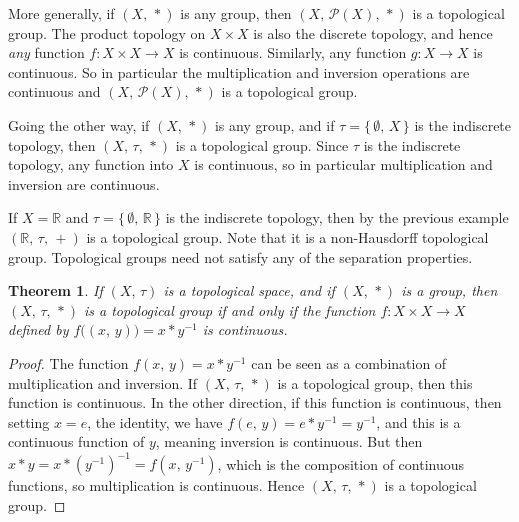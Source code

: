 \documentclass{article}
\theoremstyle{plain}
\newtheorem{theorem}{Theorem}[section]
\theoremstyle{normal}
\newenvironment{example}{%
    \pushQED{\qed}\renewcommand{\qedsymbol}{$\blacksquare$}\examplex%
}{%
    \popQED\endexamplex%
}
\begin{document}
        \begin{example}
            More generally, if $(X,\,*)$ is any group, then
            $(X,\,\mathcal{P}(X),\,*)$ is a topological group. The product
            topology on $X\times{X}$ is also the discrete topology, and hence
            \textit{any} function $f:X\times{X}\rightarrow{X}$ is continuous.
            Similarly, any function $g:X\rightarrow{X}$ is continuous. So
            in particular the multiplication and inversion operations are
            continuous and $(X,\,\mathcal{P}(X),\,*)$ is a topological group.
        \end{example}
        \begin{example}
            Going the other way, if $(X,\,*)$ is any group, and if
            $\tau=\{\,\emptyset,\,X\,\}$ is the indiscrete topology, then
            $(X,\,\tau,\,*)$ is a topological group. Since $\tau$ is the
            indiscrete topology, any function into $X$ is continuous,
            so in particular multiplication and inversion are continuous.
        \end{example}
        \begin{example}
            If $X=\mathbb{R}$ and $\tau=\{\,\emptyset,\,\mathbb{R}\,\}$ is the
            indiscrete topology, then by the previous example
            $(\mathbb{R},\,\tau,\,+)$ is a topological group. Note that it is
            a non-Hausdorff topological group. Topological groups need not
            satisfy any of the separation properties.
        \end{example}
        \begin{theorem}
            If $(X,\,\tau)$ is a topological space, and if $(X,\,*)$ is a
            group, then $(X,\,\tau,\,*)$ is a topological group if and only
            if the function $f:X\times{X}\rightarrow{X}$ defined by
            $f\big((x,\,y)\big)=x*y^{-1}$ is continuous.
        \end{theorem}
        \begin{proof}
            The function $f(x,\,y)=x*y^{-1}$ can be seen as a
            combination of multiplication and inversion. If $(X,\,\tau,\,*)$ is
            a topological group, then this function is continuous. In the
            other direction, if this function is continuous, then setting
            $x=e$, the identity, we have $f(e,\,y)=e*y^{-1}=y^{-1}$, and this
            is a continuous function of $y$, meaning inversion is continuous.
            But then $x*y=x*(y^{-1})^{-1}=f(x,\,y^{-1})$, which is
            the composition of continuous functions, so multiplication is
            continuous. Hence $(X,\,\tau,\,*)$ is a topological group.
        \end{proof}
\end{document}
